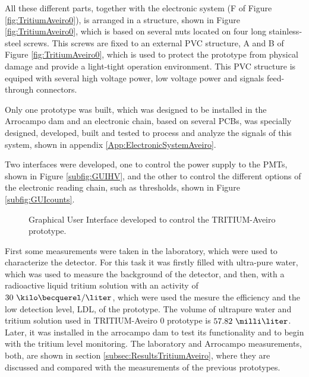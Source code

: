 All these different parts, together with the electronic system (F of Figure \ref{fig:TritiumAveiro0}), is arranged in a structure, shown in Figure \ref{fig:TritiumAveiro0}, which is based on several nuts located on four long stainless-steel screws. This screws are fixed to an external PVC structure, A and B of Figure \ref{fig:TritiumAveiro0}, which is used to protect the prototype from physical damage and provide a light-tight operation environment. This PVC structure is equiped with several high voltage power, low voltage power and signals feed-through connectors.

Only one prototype was built, which was designed to be installed in the Arrocampo dam and an electronic chain, based on several PCBs, was specially designed, developed, built and tested to process and analyze the signals of this system, shown in appendix \ref{App:ElectronicSystemAveiro}.

Two interfaces were developed, one to control the power supply to the PMTs, shown in Figure \ref{subfig:GUIHV}, and the other to control the different options of the electronic reading chain, such as thresholds, shown in Figure \ref{subfig:GUIcounts}.

\begin{figure}[htbp]
 \centering
    \newline
 \caption{Graphical User Interface developed to control the TRITIUM-Aveiro prototype.}
 \label{fig:GUITRITIUMAveiro}
\end{figure}

First some measurements were taken in the laboratory, which were used to characterize the detector. For this task it was firstly filled with ultra-pure water, which was used to measure the background of the detector, and then, with a radioactive liquid tritium solution with an activity of $30~\kilo\becquerel/\liter$, which were used the mesure the efficiency and the low detection level, LDL, of the prototype. The volume of ultrapure water and tritium solution used in TRITIUM-Aveiro 0 prototype is $57.82~\milli\liter$. Later, it was installed in the arrocampo dam to test its functionality and to begin with the tritium level monitoring. The laboratory and Arrocampo measurements, both, are shown in section \ref{subsec:ResultsTritiumAveiro}, where they are discussed and compared with the measurements of the previous prototypes.